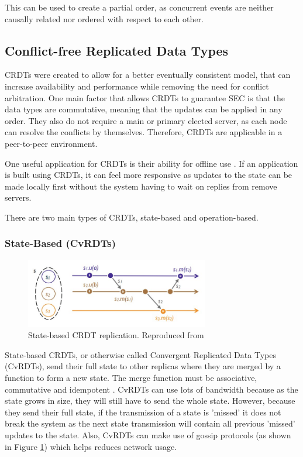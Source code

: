 \documentclass[12pt]{article}
\begin{document}
This can be used to create a partial order, as concurrent events are neither causally related nor ordered with respect to each other.

\subsection{Conflict-free Replicated Data Types}
CRDTs were created to allow for a better eventually consistent model, that can increase availability and performance while removing the need for conflict arbitration.  One main factor that allows CRDTs to guarantee SEC is that the data types are commutative\cite{10.1007/978-3-642-24550-3_29}, meaning that the updates can be applied in any order. They also do not require a main or primary elected server, as each node can resolve the conflicts by themselves. Therefore, CRDTs are applicable in a peer-to-peer environment. \par
One useful application for CRDTs is their ability for offline use \cite{10.1145/3359591.3359737}. If an application is built using CRDTs, it can feel more responsive as updates to the state can be made locally first without the system having to wait on replies from remove servers. \par
There are two main types of CRDTs, state-based and operation-based.


\subsubsection{State-Based (CvRDTs)}

\begin{figure}
    \centering
    \includegraphics[width=8cm]{state.jpg}
    \caption{State-based CRDT replication. Reproduced from \cite{10.1007/978-3-642-24550-3_29}}
    \label{fig:statebased}
\end{figure}

State-based CRDTs, or otherwise called Convergent Replicated Data Types (CvRDTs), send their full state to other replicas where they are merged by a function to form a new state. The merge function must be associative, commutative and idempotent \cite{10.1007/978-3-642-24550-3_29}. CvRDTs can use lots of bandwidth because as the state grows in size, they will still have to send the whole state. However, because they send their full state, if the transmission of a state is 'missed' it does not break the system as the next state transmission will contain all previous 'missed' updates to the state. Also, CvRDTs can make use of gossip protocols (as shown in Figure \ref{fig:statebased}) which helps reduces network usage. \par
\end{document}
